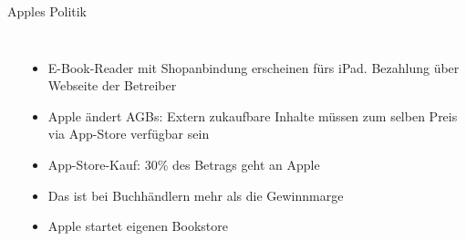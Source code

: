 \begin{frame}{Apples Politik}
	\begin{columns}
			 \\
			\begin{itemize}
				\item E-Book-Reader mit Shopanbindung erscheinen fürs iPad. Bezahlung über Webseite der Betreiber
				\item Apple ändert AGBs: Extern zukaufbare Inhalte müssen zum selben Preis via App-Store verfügbar sein
				\item App-Store-Kauf: 30\% des Betrags geht an Apple
				\item Das ist bei Buchhändlern mehr als die Gewinnmarge
				\item Apple startet eigenen Bookstore
			\end{itemize}
	\end{columns}
\end{frame}

